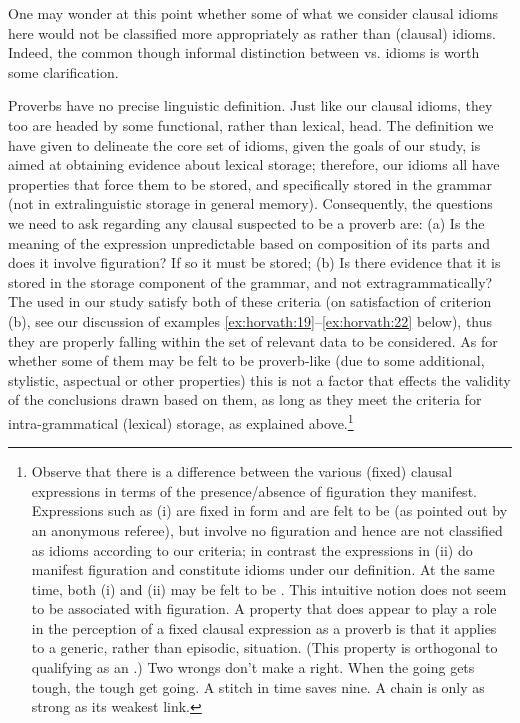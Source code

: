 \documentclass[output=paper,
modfonts
]{LSP/langsci}
\begin{document}
One may wonder at this point whether some of what we consider clausal
idioms here would not be classified more appropriately as 
rather than (clausal) idioms. Indeed, the common though informal
distinction between  vs. idioms is worth some clarification.

Proverbs have no precise linguistic definition. Just like our clausal
idioms, they too are headed by some functional, rather than lexical,
head. The definition we have given to delineate the core set of idioms,
given the goals of our study, is aimed at obtaining evidence about
lexical storage; therefore, our idioms all have properties that force
them to be stored, and specifically stored in the grammar (not in
extralinguistic storage in general memory). Consequently, the questions
we need to ask regarding any clausal  suspected to be a proverb
are: (a) Is the meaning of the expression unpredictable based on
composition of its parts and does it involve figuration? If so it must
be stored; (b) Is there evidence that it is stored in the storage
component of the grammar, and not extragrammatically? The 
used in our study satisfy both of these criteria (on satisfaction of criterion (b), see our discussion of examples \ref{ex:horvath:19}--\ref{ex:horvath:22} below), thus they are properly
falling within the set of relevant  data to be considered. As for
whether some of them may be felt to be proverb-like (due to some
additional, stylistic, aspectual or other properties) this is not a
factor that effects the validity of the conclusions drawn based on them,
as long as they meet the criteria for intra-grammatical (lexical)
storage, as explained above.\footnote{Observe that there is a difference
  between the various (fixed) clausal expressions in terms of the
  presence/absence of figuration they manifest. Expressions such as (i)
  are fixed in form and are felt to be  (as pointed out by an
  anonymous referee), but involve no figuration and hence are not
  classified as idioms according to our criteria; in contrast the
  expressions in (ii) do manifest figuration and constitute idioms under
  our definition. At the same time, both (i) and (ii) may be felt to be
  . This intuitive notion does not seem to be associated with
  figuration. A property that does appear to play a role in the
  perception of a fixed clausal expression as a proverb is that it
  applies to a generic, rather than episodic, situation. (This property
  is orthogonal to qualifying as an .)
  \ea \label{ex:horvath:fn9a}
  	\ea \label{ex:horvath:fn9a1} Two wrongs don't make a right.
	\ex \label{ex:horvath:fn9a2} When the going gets tough, the tough get going.
	\z
\ex \label{ex:horvath:fn9b}
	\ea \label{ex:horvath:fn9b1} A stitch in time saves nine.
	\ex \label{ex:horvath:fn9b2} A chain is only as strong as its weakest link.
	\z
\z
  }
\end{document}
